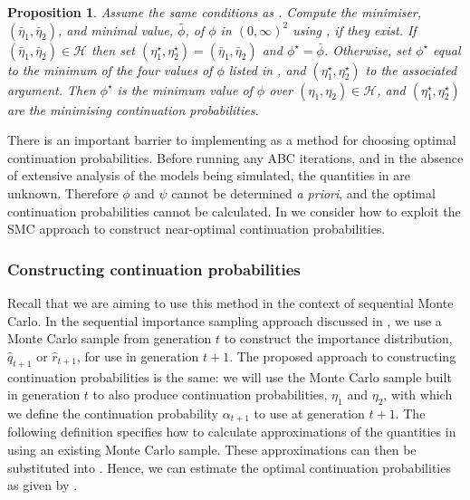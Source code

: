 \documentclass[12pt, onecolumn]{article}
\newtheorem{proposition}[theorem]{Proposition}
\begin{document}
\begin{proposition}
\label{etastar}
 Assume the same conditions as . 
 Compute the minimiser, $(\bar \eta_1, \bar \eta_2)$, and minimal value, $\bar \phi$, of $\phi$ in $(0,\infty)^2$ using , if they exist.
 If $(\bar \eta_1, \bar \eta_2) \in \mathcal H$ then set $(\eta_1^\star, \eta_2^\star) = (\bar \eta_1, \bar \eta_2)$ and $\phi^\star = \bar \phi$. 
 Otherwise, set $\phi^\star$ equal to the minimum of the four values of $\phi$ listed in , and $(\eta_1^\star, \eta_2^\star)$ to the associated argument.
Then $\phi^\star$ is the minimum value of $\phi$ over $(\eta_1, \eta_2) \in \mathcal H$, and $(\eta_1^\star, \eta_2^\star)$ are the minimising continuation probabilities.
\end{proposition}

There is an important barrier to implementing  as a method for choosing optimal continuation probabilities.
Before running any ABC iterations, and in the absence of extensive analysis of the models being simulated, the quantities in  are unknown.
Therefore $\phi$ and $\psi$ cannot be determined \emph{a priori}, and the optimal continuation probabilities cannot be calculated.
In  we consider how to exploit the SMC approach to construct near-optimal continuation probabilities. 

\subsubsection{Constructing continuation probabilities}
\label{s:eta:MC}

Recall that we are aiming to use this method in the context of sequential Monte Carlo.
In the sequential importance sampling approach discussed in , we use a Monte Carlo sample from generation $t$ to construct the importance distribution, $\hat q_{t+1}$ or $\hat r_{t+1}$, for use in generation $t+1$.
The proposed approach to constructing continuation probabilities is the same: we will use the Monte Carlo sample built in generation $t$ to also produce continuation probabilities, $\eta_1$ and $\eta_2$, with which we define the continuation probability $\alpha_{t+1}$ to use at generation $t+1$.
The following definition specifies how to calculate approximations of the quantities in  using an existing Monte Carlo sample.
These approximations can then be substituted into .
Hence, we can estimate the optimal continuation probabilities as given by .
\end{document}
